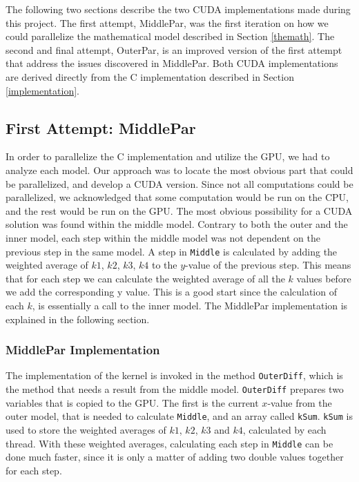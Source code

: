 The following two sections describe the two CUDA implementations made during this project. The first attempt, MiddlePar, was the first iteration on how we could parallelize the mathematical model described in Section \ref{themath}. The second and final attempt, OuterPar, is an improved version of the first attempt that address the issues discovered in MiddlePar. Both CUDA implementations are derived directly from the C implementation described in Section \ref{implementation}.

\subsection{First Attempt: MiddlePar}
\label{sec:firstattempt}
In order to parallelize the C implementation and utilize the GPU, we had to analyze each model. Our approach was to locate the most obvious part that could be parallelized, and develop a CUDA version. Since not all computations could be parallelized, we acknowledged that some computation would be run on the CPU, and the rest would be run on the GPU. The most obvious possibility for a CUDA solution was found within the middle model. Contrary to both the outer and the inner model, each step within the middle model was not dependent on the previous step in the same model. A step in \texttt{Middle} is calculated by adding the weighted average of $k1$, $k2$, $k3$, $k4$ to the $y$-value of the previous step. This means that for each step we can calculate the weighted average of all the $k$ values before we add the corresponding y value. This is a good start since the calculation of each $k$, is essentially a call to the inner model. The MiddlePar implementation is explained in the following section.

\subsubsection{MiddlePar Implementation}
The implementation of the kernel is invoked in the method \texttt{OuterDiff}, which is the method that needs a result from the middle model. \texttt{OuterDiff} prepares two variables that is copied to the GPU. The first is the current $x$-value from the outer model, that is needed to calculate \texttt{Middle}, and an array called \texttt{kSum}. \texttt{kSum} is used to store the weighted averages of $k1$, $k2$, $k3$ and $k4$, calculated by each thread. With these weighted averages, calculating each step in \texttt{Middle} can be done much faster, since it is only a matter of adding two double values together for each step. \\

